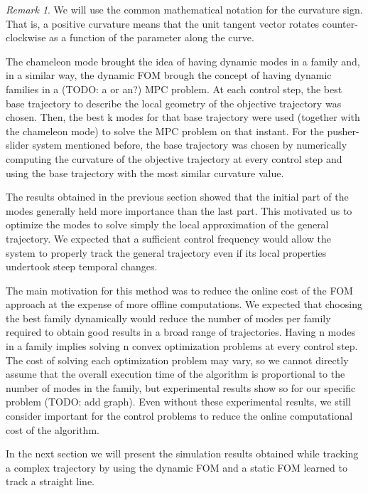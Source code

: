 \documentclass[12,twoside]{TFG-GM}
\theoremstyle{definition}
\theoremstyle{remark}
\newtheorem{remark}[theorem]{Remark}
\begin{document}
\begin{remark}
We will use the common mathematical notation for the curvature sign. That is, a positive curvature means that the unit tangent vector rotates counter-clockwise as a function of the parameter along the curve.
\end{remark}

The chameleon mode brought the idea of having dynamic modes in a family and, in a similar way, the dynamic FOM brough the concept of having dynamic families in a (TODO: a or an?) MPC problem. At each control step, the best base trajectory to describe the local geometry of the objective trajectory was chosen. Then, the best k modes for that base trajectory were used (together with the chameleon mode) to solve the MPC problem on that instant. For the pusher-slider system mentioned before, the base trajectory was chosen by numerically computing the curvature of the objective trajectory at every control step and using the base trajectory with the most similar curvature value.

The results obtained in the previous section showed that the initial part of the modes generally held more importance than the last part. This motivated us to optimize the modes to solve simply the local approximation of the general trajectory. We expected that a sufficient control frequency would allow the system to properly track the general trajectory even if its local properties undertook steep temporal changes.

The main motivation for this method was to reduce the online cost of the FOM approach at the expense of more offline computations. We expected that choosing the best family dynamically would reduce the number of modes per family required to obtain good results in a broad range of trajectories. Having n modes in a family implies solving n convex optimization problems at every control step. The cost of solving each optimization problem may vary, so we cannot directly assume that the overall execution time of the algorithm is proportional to the number of modes in the family, but experimental results show so for our specific problem (TODO: add graph). Even without these experimental results, we still consider important for the control problems to reduce the online computational cost of the algorithm.

In the next section we will present the simulation results obtained while tracking a complex trajectory by using the dynamic FOM and a static FOM learned to track a straight line.
\end{document}
